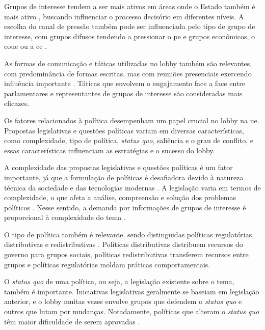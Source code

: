     Grupos de interesse tendem a ser mais ativos em áreas onde o Estado também é mais ativo \cite{mahoney2008brussels}, buscando influenciar o processo decisório em diferentes níveis. A escolha do canal de pressão também pode ser influenciada pelo tipo de grupo de interesse, com grupos difusos tendendo a pressionar o \acrshort{pe} e grupos econômicos, o \acrshort{coue} ou a \acrshort{ce} \cite{coen2019legislative}.

    As formas de comunicação e táticas utilizadas no lobby também são relevantes, com predominância de formas escritas, mas com reuniões presenciais exercendo influência importante \cite{Huwyler2022}. Táticas que envolvem o engajamento face a face entre parlamentares e representantes de grupos de interesse são consideradas mais eficazes.

Os fatores relacionados à política desempenham um papel crucial no lobby na \acrshort{ue}. Propostas legislativas e questões políticas variam em diversas características, como complexidade, tipo de política, \textit{status quo}, saliência e o grau de conflito, e essas características influenciam as estratégias e o sucesso do lobby.

    A complexidade das propostas legislativas e questões políticas é um fator importante, já que a formulação de políticas é desafiadora devido à natureza técnica da sociedade e das tecnologias modernas \cite{kluver2015legislative}. A legislação varia em termos de complexidade, o que afeta a análise, compreensão e solução dos problemas políticos \cite{kluver_informational_2012}. Nesse sentido, a demanda por informações de grupos de interesse é proporcional à complexidade do tema \cite{kluver_informational_2012}.

    O tipo de política também é relevante, sendo distinguidas políticas regulatórias, distributivas e redistributivas \cite{lowi1964american}. Políticas distributivas distribuem recursos do governo para grupos sociais, políticas redistributivas transferem recursos entre grupos e políticas regulatórias moldam práticas comportamentais.

    O \textit{status quo }de uma política, ou seja, a legislação existente sobre o tema, também é importante. Iniciativas legislativas geralmente se baseiam em legislação anterior, e o lobby muitas vezes envolve grupos que defendem o \textit{status quo} e outros que lutam por mudanças. Notadamente, políticas que alteram o \textit{status quo} têm maior dificuldade de serem aprovadas \cite{baumgartner2009lobbying}.

